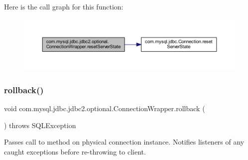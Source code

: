 Here is the call graph for this function\+:
\nopagebreak
\begin{figure}[H]
\begin{center}
\leavevmode
\includegraphics[width=350pt]{classcom_1_1mysql_1_1jdbc_1_1jdbc2_1_1optional_1_1_connection_wrapper_af3edf0f2f10ef1647b70c9d54a9b7290_cgraph}
\end{center}
\end{figure}
\mbox{\label{classcom_1_1mysql_1_1jdbc_1_1jdbc2_1_1optional_1_1_connection_wrapper_a970363042f006042fefc3c7a3f2d93f1}} 
\subsubsection{\texorpdfstring{rollback()}{rollback()}\hspace{0.1cm}{\footnotesize\ttfamily [1/2]}}
{\footnotesize\ttfamily void com.\+mysql.\+jdbc.\+jdbc2.\+optional.\+Connection\+Wrapper.\+rollback (\begin{DoxyParamCaption}{ }\end{DoxyParamCaption}) throws S\+Q\+L\+Exception}

Passes call to method on physical connection instance. Notifies listeners of any caught exceptions before re-\/throwing to client.


